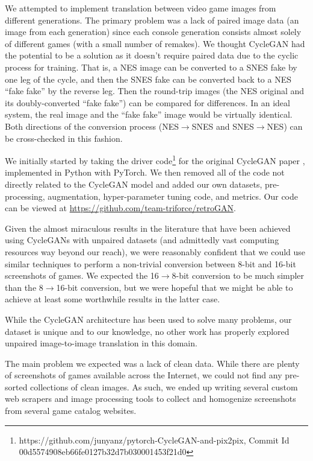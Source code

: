\documentclass[10pt,twocolumn,letterpaper]{article}
\begin{document}
We attempted to implement translation between video game images from different generations. The primary problem was a lack of paired image data (an image from each generation) since each console generation consists almost solely of different games (with a small number of remakes). We thought CycleGAN had the potential to be a solution as it doesn't require paired data due to the cyclic process for training. That is, a NES image can be converted to a SNES fake by one leg of the cycle, and then the SNES fake can be converted back to a NES ``fake fake'' by the reverse leg. Then the round-trip images (the NES original and its doubly-converted ``fake fake'') can be compared for differences. In an ideal system, the real image and the ``fake fake'' image would be virtually identical. Both directions of the conversion process (NES$\rightarrow$SNES and SNES$\rightarrow$NES) can be cross-checked in this fashion.

We initially started by taking the driver code\footnote{https://github.com/junyanz/pytorch-CycleGAN-and-pix2pix, Commit Id 00d5574908eb66fe0127b32d7b030001453f21d0} for the original CycleGAN paper \cite{CycleGAN}, implemented in Python with PyTorch. We then removed all of the code not directly related to the CycleGAN model and added our own datasets, pre-processing, augmentation, hyper-parameter tuning code, and metrics. Our code can be viewed at \url{https://github.com/team-triforce/retroGAN}.

Given the almost miraculous results in the literature that have been achieved using CycleGANs with unpaired datasets (and admittedly vast computing resources way beyond our reach), we were reasonably confident that we could use similar techniques to perform a non-trivial conversion between 8-bit and 16-bit screenshots of games. We expected the 16$\rightarrow$8-bit conversion to be much simpler than the 8$\rightarrow$16-bit conversion, but we were hopeful that we might be able to achieve at least some worthwhile results in the latter case.

While the CycleGAN architecture has been used to solve many problems, our dataset is unique and to our knowledge, no other work has properly explored unpaired image-to-image translation in this domain.


The main problem we expected was a lack of clean data. While there are plenty of screenshots of games available across the Internet, we could not find any pre-sorted collections of clean images. As such, we ended up writing several custom web scrapers and image processing tools to collect and homogenize screenshots from several game catalog websites.
\end{document}
